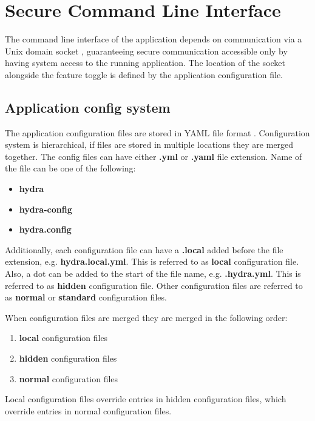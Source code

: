 \documentclass[../main.tex]{subfiles}
\begin{document}
\section{Secure Command Line Interface}

The command line interface of the application depends on communication via a Unix domain socket \cite{unix_domain_socket},
guaranteeing secure communication accessible only by having system access to the running application.
The location of the socket alongside the feature toggle is defined by the application configuration file.

\subsection{Application config system}

The application configuration files are stored in YAML file format \cite{yaml}.
Configuration system is hierarchical, if files are stored in multiple locations they are merged together.
The config files can have either \textbf{.yml} or \textbf{.yaml} file extension.
Name of the file can be one of the following:
\begin{itemize}
  \item \textbf{hydra}
  \item \textbf{hydra-config}
  \item \textbf{hydra.config}
\end{itemize}

Additionally, each configuration file can have a \textbf{.local} added before the file extension, e.g. \textbf{hydra.local.yml}. This is referred to as \textbf{local} configuration file.
Also, a dot can be added to the start of the file name, e.g. \textbf{.hydra.yml}. This is referred to as \textbf{hidden} configuration file. Other configuration files are referred to as \textbf{normal} or \textbf{standard} configuration files.

When configuration files are merged they are merged in the following order:
\begin{enumerate}
  \item \textbf{local} configuration files
  \item \textbf{hidden} configuration files
  \item \textbf{normal} configuration files
\end{enumerate}

Local configuration files override entries in hidden configuration files, which override entries in normal configuration files.
\end{document}
